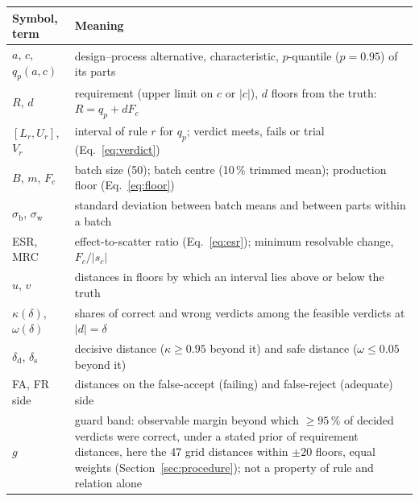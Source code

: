 \documentclass[pdflatex,sn-basic,lineno]{sn-jnl}
\providecommand{\DIFaddbeginFL}{} %
\providecommand{\DIFdelendFL}{} %
\newcommand{\DIFaddincludegraphics}[2][]{{\color{blue}\fbox{\DIFOincludegraphics[#1]{#2}}}} %
\DeclareRobustCommand{\DIFaddbeginFL}{\DIFOaddbeginFL \let\includegraphics\DIFaddincludegraphics} %
\DeclareRobustCommand{\DIFdelendFL}{\DIFOaddendFL \let\includegraphics\DIFOincludegraphics} %
\begin{document}
\begin{appendices}
\begin{table}[p]
\DIFdelendFL \DIFaddbeginFL \begin{tabular}{@{}L{3.0cm}L{9.75cm}@{}}
\toprule
Symbol, term & Meaning \\
\midrule
$a$, $c$, $q_p(a,c)$ & design--process alternative, characteristic, $p$-quantile ($p=0.95$) of its parts \\
$R$, $d$ & requirement (upper limit on $c$ or $|c|$), $d$ floors from the truth: $R=q_p+dF_c$ \\
$[L_r,U_r]$, $V_r$ & interval of rule $r$ for $q_p$; verdict meets, fails or trial (Eq.~\ref{eq:verdict}) \\
$B$, $m$, $F_c$ & batch size (50); batch centre (10\,\% trimmed mean); production floor (Eq.~\ref{eq:floor}) \\
$\sigma_\mathrm{b}$, $\sigma_\mathrm{w}$ & standard deviation between batch means and between parts within a batch \\
ESR, MRC & effect-to-scatter ratio (Eq.~\ref{eq:esr}); minimum resolvable change, $F_c/|s_c|$ \\
$u$, $v$ & distances in floors by which an interval lies above or below the truth \\
$\kappa(\delta)$, $\omega(\delta)$ & shares of correct and wrong verdicts among the feasible verdicts at $|d|=\delta$ \\
$\delta_\mathrm{d}$, $\delta_\mathrm{s}$ & decisive distance ($\kappa\ge0.95$ beyond it) and safe distance ($\omega\le0.05$ beyond it) \\
FA, FR side & distances on the false-accept (failing) and false-reject (adequate) side \\
$g$ & guard band: observable margin beyond which ${\ge}95$\,\% of decided verdicts were correct, under a stated prior of requirement distances, here the 47 grid distances within $\pm20$ floors, equal weights (Section~\ref{sec:procedure}); not a property of rule and relation alone \\

\end{tabular}
\end{table}
\end{appendices}
\end{document}
